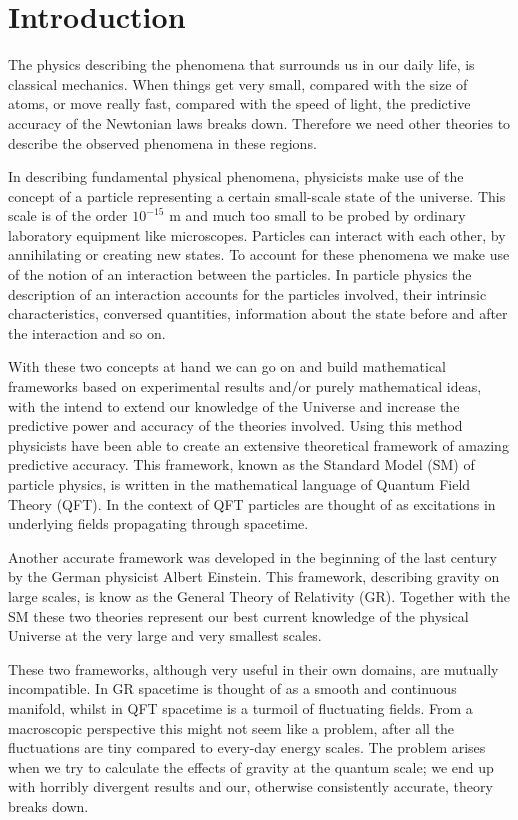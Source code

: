 \section{Introduction}
The physics describing the phenomena that surrounds us in our daily life, is classical mechanics. When things get very small, compared with the size of atoms, or move really fast, compared with the speed of light, the predictive accuracy of the Newtonian laws breaks down. Therefore we need other theories to describe the observed phenomena in these regions.

In describing fundamental physical phenomena, physicists make use of the concept of a particle representing a certain small-scale state of the universe. This scale is of the order $10^{-15}$ m and much too small to be probed by ordinary laboratory equipment like microscopes. Particles can interact with each other, by annihilating or creating new states. To account for these phenomena we make use of the notion of an interaction between the particles. In particle physics the description of an interaction accounts for the particles involved, their intrinsic characteristics, conversed quantities, information about the state before and after the interaction and so on.

With these two concepts at hand we can go on and build mathematical frameworks based on experimental results and/or purely mathematical ideas, with the intend to extend our knowledge of the Universe and increase the predictive power and accuracy of the theories involved. Using this method physicists have been able to create an extensive theoretical framework of amazing predictive accuracy. This framework, known as the Standard Model (SM) of particle physics, is written in the mathematical language of Quantum Field Theory (QFT). In the context of QFT particles are thought of as excitations in underlying fields propagating through spacetime.

Another accurate framework was developed in the beginning of the last century by the German physicist Albert Einstein. This framework, describing gravity on large scales, is know as the General Theory of Relativity (GR). Together with the SM these two theories represent our best current knowledge of the physical Universe at the very large and very smallest scales.

These two frameworks, although very useful in their own domains, are mutually incompatible. In GR spacetime is thought of as a smooth and continuous manifold, whilst in QFT spacetime is a turmoil of fluctuating fields. From a macroscopic perspective this might not seem like a problem, after all the fluctuations are tiny compared to every-day energy scales. The problem arises when we try to calculate the effects of gravity at the quantum scale; we end up with horribly divergent results and our, otherwise consistently accurate, theory breaks down.

